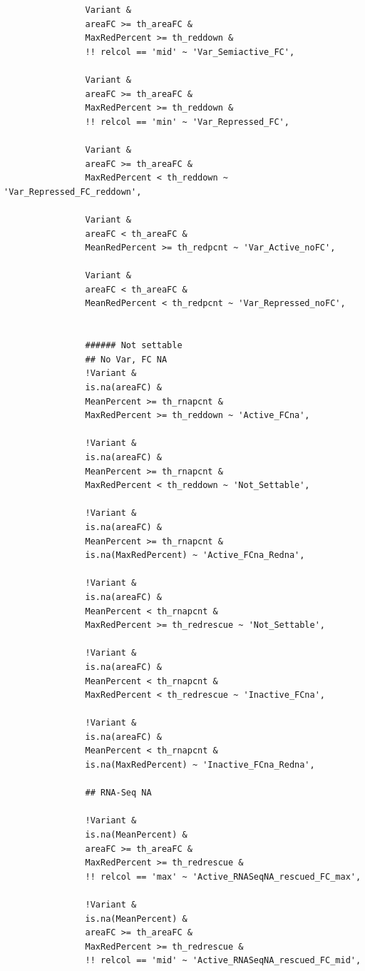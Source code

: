 \documentclass[11pt]{article}
\begin{document}
\begin{verbatim}
                Variant &
                areaFC >= th_areaFC &
                MaxRedPercent >= th_reddown &
                !! relcol == 'mid' ~ 'Var_Semiactive_FC',

                Variant &
                areaFC >= th_areaFC &
                MaxRedPercent >= th_reddown &
                !! relcol == 'min' ~ 'Var_Repressed_FC',

                Variant &
                areaFC >= th_areaFC &
                MaxRedPercent < th_reddown ~ 'Var_Repressed_FC_reddown',

                Variant &
                areaFC < th_areaFC &
                MeanRedPercent >= th_redpcnt ~ 'Var_Active_noFC',

                Variant &
                areaFC < th_areaFC &
                MeanRedPercent < th_redpcnt ~ 'Var_Repressed_noFC',


                ###### Not settable
                ## No Var, FC NA
                !Variant &
                is.na(areaFC) &
                MeanPercent >= th_rnapcnt &
                MaxRedPercent >= th_reddown ~ 'Active_FCna',

                !Variant &
                is.na(areaFC) &
                MeanPercent >= th_rnapcnt &
                MaxRedPercent < th_reddown ~ 'Not_Settable',

                !Variant &
                is.na(areaFC) &
                MeanPercent >= th_rnapcnt &
                is.na(MaxRedPercent) ~ 'Active_FCna_Redna',

                !Variant &
                is.na(areaFC) &
                MeanPercent < th_rnapcnt &
                MaxRedPercent >= th_redrescue ~ 'Not_Settable',

                !Variant &
                is.na(areaFC) &
                MeanPercent < th_rnapcnt &
                MaxRedPercent < th_redrescue ~ 'Inactive_FCna',

                !Variant &
                is.na(areaFC) &
                MeanPercent < th_rnapcnt &
                is.na(MaxRedPercent) ~ 'Inactive_FCna_Redna',

                ## RNA-Seq NA

                !Variant &
                is.na(MeanPercent) &
                areaFC >= th_areaFC &
                MaxRedPercent >= th_redrescue &
                !! relcol == 'max' ~ 'Active_RNASeqNA_rescued_FC_max',

                !Variant &
                is.na(MeanPercent) &
                areaFC >= th_areaFC &
                MaxRedPercent >= th_redrescue &
                !! relcol == 'mid' ~ 'Active_RNASeqNA_rescued_FC_mid',


\end{verbatim}
\end{document}
